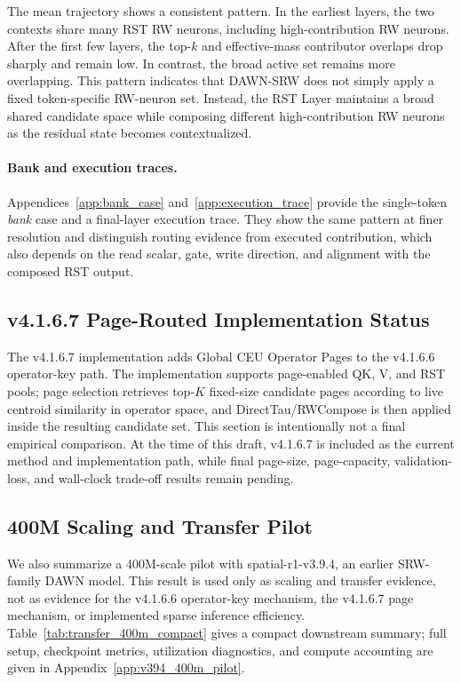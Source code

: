 \documentclass{article}
\begin{document}
The mean trajectory shows a consistent pattern. In the earliest layers, the two contexts share many RST RW neurons, including high-contribution RW neurons. After the first few layers, the top-$k$ and effective-mass contributor overlaps drop sharply and remain low. In contrast, the broad active set remains more overlapping. This pattern indicates that DAWN-SRW does not simply apply a fixed token-specific RW-neuron set. Instead, the RST Layer maintains a broad shared candidate space while composing different high-contribution RW neurons as the residual state becomes contextualized.

\paragraph{Bank and execution traces.}
Appendices~\ref{app:bank_case} and~\ref{app:execution_trace} provide the single-token \emph{bank} case and a final-layer execution trace. They show the same pattern at finer resolution and distinguish routing evidence from executed contribution, which also depends on the read scalar, gate, write direction, and alignment with the composed RST output.

\subsection{v4.1.6.7 Page-Routed Implementation Status}
\label{sec:page_status}

The v4.1.6.7 implementation adds Global CEU Operator Pages to the v4.1.6.6 operator-key path. The implementation supports page-enabled QK, V, and RST pools; page selection retrieves top-\(K\) fixed-size candidate pages according to live centroid similarity in operator space, and DirectTau/RWCompose is then applied inside the resulting candidate set. This section is intentionally not a final empirical comparison. At the time of this draft, v4.1.6.7 is included as the current method and implementation path, while final page-size, page-capacity, validation-loss, and wall-clock trade-off results remain pending.

\subsection{400M Scaling and Transfer Pilot}
\label{sec:downstream_400m}

We also summarize a 400M-scale pilot with spatial-r1-v3.9.4, an earlier SRW-family DAWN model. This result is used only as scaling and transfer evidence, not as evidence for the v4.1.6.6 operator-key mechanism, the v4.1.6.7 page mechanism, or implemented sparse inference efficiency. Table~\ref{tab:transfer_400m_compact} gives a compact downstream summary; full setup, checkpoint metrics, utilization diagnostics, and compute accounting are given in Appendix~\ref{app:v394_400m_pilot}.
\end{document}
